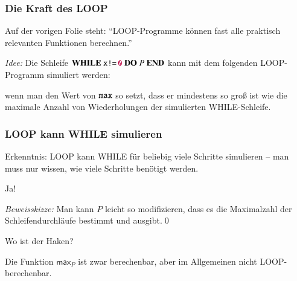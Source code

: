 \documentclass[onlymath]{beamer}
\begin{document}
\begin{frame}\frametitle{Die Kraft des LOOP}

Auf der vorigen Folie steht: "`LOOP-Programme können fast alle praktisch relevanten Funktionen berechnen."'
\medskip

\bigskip\pause

\emph{Idee:} Die Schleife $\textbf{WHILE}~\texttt{x}\texttt{!=}\,\texttt{\textcolor{purple}{0}}~\textbf{DO}~P~\textbf{END}$ kann mit dem folgenden LOOP-Programm simuliert werden:\medskip

\pause

wenn man den Wert von $\texttt{max}$ so setzt, dass er \alert{mindestens} so groß ist
wie die maximale Anzahl von Wiederholungen der simulierten WHILE-Schleife.

\end{frame}

\begin{frame}\frametitle{LOOP kann WHILE simulieren}

\alert{Erkenntnis:} LOOP kann WHILE für beliebig viele Schritte simulieren -- man muss nur wissen, wie viele Schritte benötigt werden.
\bigskip

\pause{} \alert{Ja!}\bigskip

\emph{Beweisskizze:} Man kann $P$ leicht so modifizieren, dass es die Maximalzahl der Schleifendurchläufe bestimmt und ausgibt.\qed\medskip\pause

\alert{Wo ist der Haken?}\pause\medskip

Die Funktion $\textsf{max}_P$ ist zwar berechenbar, aber im Allgemeinen nicht LOOP-berechenbar.

\end{frame}
\end{document}
